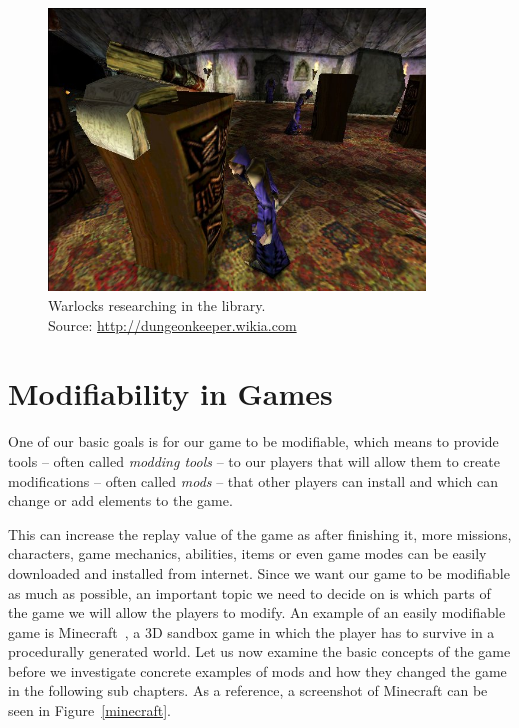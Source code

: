 \begin{figure}[h]
    \centering
    \includegraphics[width=10cm]{../img/library.jpg}
    \caption{Warlocks researching in the library.
             \\Source: \href{http://vignette2.wikia.nocookie.net/dungeonkeeper/images/9/98/Library.jpg/revision/latest?cb=20120808211437}{http://dungeonkeeper.wikia.com}}
    \label{dk-lib}
\end{figure}

\section{Modifiability in Games}

One of our basic goals is for our game to be modifiable, which means to provide tools -- often called \emph{modding tools} -- to our players
that will allow them to create modifications -- often called \emph{mods} -- that other players can install and which can change or
add elements to the game.

This can increase the replay value of the game as after finishing it, more missions, characters, game mechanics, abilities, items
or even game modes can be easily downloaded and installed from internet. Since we want our game to be modifiable as much as
possible, an important topic we need to decide on is which parts of the game we will allow the players to modify. 
An example of an easily modifiable game is Minecraft~\cite{Minecraft}, a 3D sandbox game 
in which the player has to survive in a procedurally generated world. Let us now examine the basic concepts of the game before
we investigate concrete examples of mods and how they changed the game in the following sub chapters. 
As a reference, a screenshot of Minecraft can be seen in Figure~\ref{minecraft}. 

